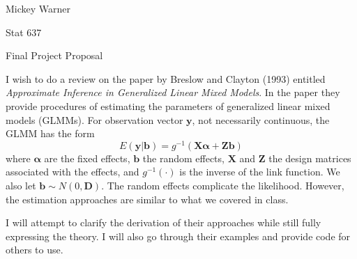 \documentclass[12pt]{article}
\newcommand{\m}[1]{\mathbf{\bm{#1}}}
\begin{document}
\noindent Mickey Warner
\bigskip

\noindent Stat 637
\bigskip

\noindent Final Project Proposal
\bigskip

\noindent I wish to do a review on the paper by Breslow and Clayton (1993) entitled \emph{Approximate Inference in Generalized Linear Mixed Models}. In the paper they provide procedures of estimating the parameters of generalized linear mixed models (GLMMs). For observation vector $\m{y}$, not necessarily continuous, the GLMM has the form
\[ E(\m{y}|\m{b}) = g^{-1}(\m{X}\m{\alpha} + \m{Z}\m{b}) \]
where $\m{\alpha}$ are the fixed effects, $\m{b}$ the random effects, $\m{X}$ and $\m{Z}$ the design matrices associated with the effects, and $g^{-1}(\cdot)$ is the inverse of the link function. We also let $\m{b}\sim N(0, \m{D})$. The random effects complicate the likelihood. However, the estimation approaches are similar to what we covered in class.
\bigskip

\noindent I will attempt to clarify the derivation of their approaches while still fully expressing the theory. I will also go through their examples and provide code for others to use.
\end{document}
